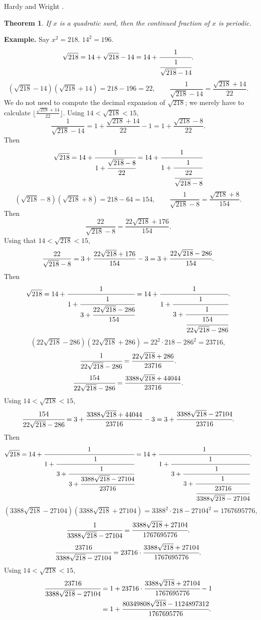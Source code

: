 \documentclass{article}
\newtheorem{theorem}{Theorem}
\theoremstyle{definition}
\begin{document}
Hardy and Wright \cite[p.~144, Theorem 177]{HW}.

\begin{theorem}
If $x$ is a quadratic surd, then the continued fraction of $x$ is periodic.
\end{theorem}



\textbf{Example.} Say $x^2=218$. $14^2=196$. 
\[
\sqrt{218}=14+\sqrt{218}-14
=14+\cfrac{1}{\cfrac{1}{\sqrt{218}-14}}.
\]
\[
(\sqrt{218}-14)(\sqrt{218}+14) = 218 - 196=22,
\qquad
\frac{1}{\sqrt{218}-14} = \frac{\sqrt{218}+14}{22}.
\]
We do not need to compute the decimal expansion of $\sqrt{218}$; we merely
have to calculate $\lfloor \frac{\sqrt{218}+14}{22}\rfloor$. 
Using $14<\sqrt{218}<15$, 
\[
\frac{1}{\sqrt{218}-14} = 1 + \frac{\sqrt{218}+14}{22} - 1
=1 + \frac{\sqrt{218}-8}{22}.
\]
Then
\[
\sqrt{218} = 
14+\cfrac{1}{1 + \cfrac{\sqrt{218}-8}{22}}
=
14+\cfrac{1}{1 + \cfrac{1}{\cfrac{22}{\sqrt{218}-8}}}
\]
\[
(\sqrt{218}-8)(\sqrt{218}+8) = 218 - 64 = 154,
\qquad \frac{1}{\sqrt{218}-8} = \frac{\sqrt{218}+8}{154}.
\]
Then 
\[
\frac{22}{\sqrt{218}-8} = \frac{22\sqrt{218}+176}{154}.
\]
Using that $14<\sqrt{218}<15$,
\[
\frac{22}{\sqrt{218}-8}  = 3+  \frac{22\sqrt{218}+176}{154} -3
=3 + \cfrac{22\sqrt{218}-286}{154}.
\]
Then
\[
\sqrt{218}
=14+\cfrac{1}{1 + \cfrac{1}{3 + \cfrac{22\sqrt{218}-286}{154}}}
=14+\cfrac{1}{1 + \cfrac{1}{3 + \cfrac{1}{\cfrac{154}{22\sqrt{218}-286}}}}.
\]
\[
(22\sqrt{218}-286)(22\sqrt{218}+286)
=22^2 \cdot 218 - 286^2 = 23716,
\]
\[
\cfrac{1}{22\sqrt{218}-286} = \frac{22\sqrt{218}+286}{23716}.
\]
\[
\cfrac{154}{22\sqrt{218}-286}
=\frac{3388\sqrt{218}+44044}{23716}.
\]
Using $14<\sqrt{218}<15$,
\[
\cfrac{154}{22\sqrt{218}-286} = 3 + \frac{3388\sqrt{218}+44044}{23716} - 3
=3+\cfrac{3388\sqrt{218}-27104}{23716}.
\]
Then
\[
\sqrt{218}
=
14+\cfrac{1}{1 + \cfrac{1}{3 + \cfrac{1}{3+\cfrac{3388\sqrt{218}-27104}{23716}}}}
=
14+\cfrac{1}{1 + \cfrac{1}{3 + \cfrac{1}{3+\cfrac{1}{\cfrac{23716}{3388\sqrt{218}-27104}}}}}.
\]
\[
(3388\sqrt{218}-27104)(3388\sqrt{218}+27104)
=3388^2 \cdot 218 - 27104^2
=1767695776,
\]
\[
\cfrac{1}{3388\sqrt{218}-27104} = \cfrac{3388\sqrt{218}+27104}{1767695776}.
\]
\[
\cfrac{23716}{3388\sqrt{218}-27104}= 23716 \cdot \cfrac{3388\sqrt{218}+27104}{1767695776}.
\]
Using $14<\sqrt{218}<15$,
\begin{align*}
\cfrac{23716}{3388\sqrt{218}-27104} &= 1 +23716 \cdot \cfrac{3388\sqrt{218}+27104}{1767695776} - 1\\
&=1
+\cfrac{80349808 \sqrt{218} -1124897312}{1767695776}.
\end{align*}
\end{document}
